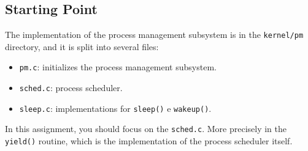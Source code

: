 \documentclass[11pt]{article}
\newif\ifbr
\newif\ifen
\begin{document}
\fi\fi

\ifbr
	\subsubsection*{Por Onde Começar?}

		O código do gerenciador de processos do Nanvix está no diretório
		\texttt{kernel/pm}, dividido em vários arquivos, dentre eles:

		\begin{itemize}
			\item \texttt{pm.c}: inicialização do gerenciador de processos.
			\item \texttt{sched.c}: escalonamento de processos.
			\item \texttt{sleep.c}: implementação das funções utilitárias \texttt{sleep()} e \texttt{wakeup()}.
		\end{itemize}

		Nesse projeto, você deve se atentar ao arquivo \texttt{sched.c},
		principalmente na função \texttt{yield()}, que implementa a função
		de escalonamento.
\else\ifen
	\subsection*{Starting Point}
	
		The implementation of the process management subsystem is in the
		\texttt{kernel/pm} directory, and it is split into several
		files:
		\begin{itemize}
			\item \texttt{pm.c}: initializes the process management subsystem.
			\item \texttt{sched.c}: process scheduler.
			\item \texttt{sleep.c}: implementations for  \texttt{sleep()} e \texttt{wakeup()}.
		\end{itemize}

		In this assignment, you should focus on the \texttt{sched.c}.
		More precisely in the \texttt{yield()} routine, which is the
		implementation of the process scheduler itself.
\fi
\end{document}
